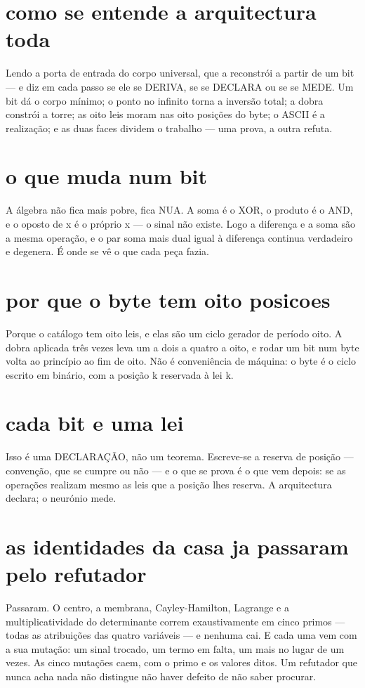 \documentclass[11pt,a4paper]{article}
\begin{document}
\section{como se entende a arquitectura toda}
Lendo a porta de entrada do corpo universal, que a reconstrói a partir de um bit — e diz
em cada passo se ele se DERIVA, se se DECLARA ou se se MEDE. Um bit dá o corpo mínimo; o
ponto no infinito torna a inversão total; a dobra constrói a torre; as oito leis moram nas
oito posições do byte; o ASCII é a realização; e as duas faces dividem o trabalho — uma
prova, a outra refuta.

\section{o que muda num bit}
A álgebra não fica mais pobre, fica NUA. A soma é o XOR, o produto é o AND, e o oposto de x
é o próprio x — o sinal não existe. Logo a diferença e a soma são a mesma operação, e o par
soma mais dual igual à diferença continua verdadeiro e degenera. É onde se vê o que cada
peça fazia.

\section{por que o byte tem oito posicoes}
Porque o catálogo tem oito leis, e elas são um ciclo gerador de período oito. A dobra
aplicada três vezes leva um a dois a quatro a oito, e rodar um bit num byte volta ao
princípio ao fim de oito. Não é conveniência de máquina: o byte é o ciclo escrito em
binário, com a posição k reservada à lei k.

\section{cada bit e uma lei}
Isso é uma DECLARAÇÃO, não um teorema. Escreve-se a reserva de posição — convenção, que se
cumpre ou não — e o que se prova é o que vem depois: se as operações realizam mesmo as leis
que a posição lhes reserva. A arquitectura declara; o neurónio mede.

\section{as identidades da casa ja passaram pelo refutador}
Passaram. O centro, a membrana, Cayley-Hamilton, Lagrange e a multiplicatividade do
determinante correm exaustivamente em cinco primos — todas as atribuições das quatro
variáveis — e nenhuma cai. E cada uma vem com a sua mutação: um sinal trocado, um termo em
falta, um mais no lugar de um vezes. As cinco mutações caem, com o primo e os valores
ditos. Um refutador que nunca acha nada não distingue não haver defeito de não saber
procurar.
\end{document}
